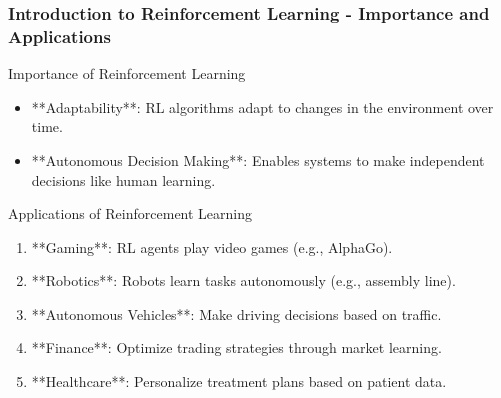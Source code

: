 \documentclass[aspectratio=169]{beamer}
\begin{document}
\begin{frame}[fragile]
    \frametitle{Introduction to Reinforcement Learning - Importance and Applications}
    \begin{block}{Importance of Reinforcement Learning}
        \begin{itemize}
            \item **Adaptability**: RL algorithms adapt to changes in the environment over time.
            \item **Autonomous Decision Making**: Enables systems to make independent decisions like human learning.
        \end{itemize}
    \end{block}
    
    \begin{block}{Applications of Reinforcement Learning}
        \begin{enumerate}
            \item **Gaming**: RL agents play video games (e.g., AlphaGo).
            \item **Robotics**: Robots learn tasks autonomously (e.g., assembly line).
            \item **Autonomous Vehicles**: Make driving decisions based on traffic.
            \item **Finance**: Optimize trading strategies through market learning.
            \item **Healthcare**: Personalize treatment plans based on patient data.
        \end{enumerate}
    \end{block}
\end{frame}
\end{document}
